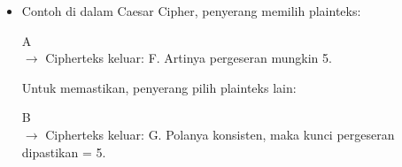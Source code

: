 \documentclass{article}
\begin{document}

\begin{itemize}
    \item Contoh di dalam Caesar Cipher, penyerang memilih plainteks:
    
    A \\ $\rightarrow$ Cipherteks keluar: F. Artinya pergeseran mungkin 5.

    Untuk memastikan, penyerang pilih plainteks lain:
    
    B \\ $\rightarrow$ Cipherteks keluar: G. Polanya konsisten, maka kunci pergeseran dipastikan = 5.
\end{itemize}
\end{document}
